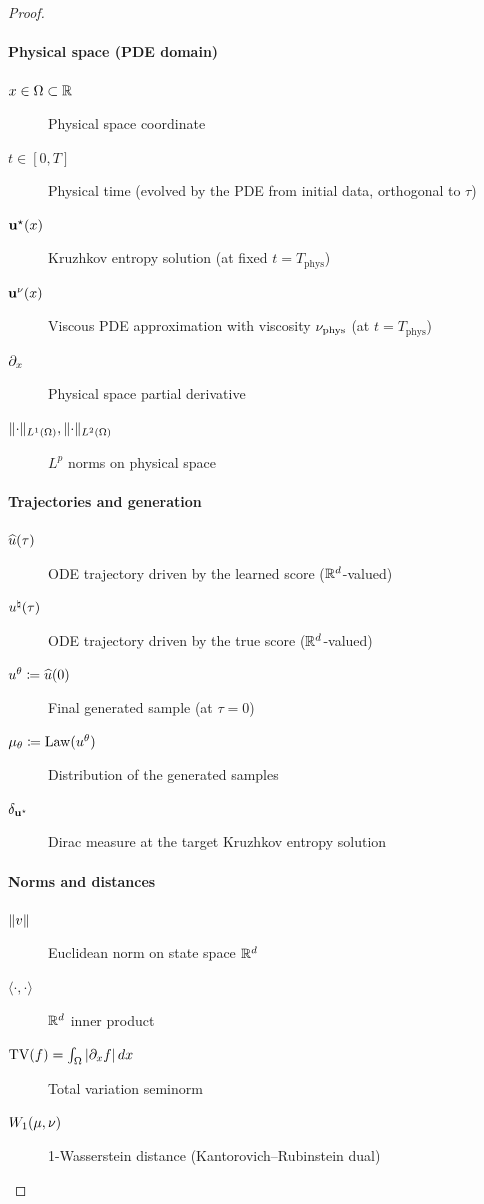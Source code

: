 \begin{proof}
\paragraph{Physical space (PDE domain)}
\begin{description}
  \item[$x \in \Omega \subset \mathbb{R}$] Physical space coordinate
  \item[{$t \in [0, T]$}] Physical time (evolved by the PDE from initial data, orthogonal to $\tau$)
  \item[$\mathbf{u}^{\star}(x)$] Kruzhkov entropy solution (at fixed $t = T_{\mathrm{phys}}$)
  \item[$\mathbf{u}^{\nu}(x)$] Viscous PDE approximation with viscosity $\nu_{\mathrm{phys}}$ (at $t = T_{\mathrm{phys}}$)
  \item[$\partial_{x}$] Physical space partial derivative
  \item[$\lVert \cdot \rVert_{L^1(\Omega)}, \lVert \cdot \rVert_{L^2(\Omega)}$] $L^p$ norms on physical space
\end{description}

\paragraph{Trajectories and generation}
\begin{description}
  \item[$\widehat{u}(\tau)$] ODE trajectory driven by the learned score ($\mathbb{R}^d$-valued)
  \item[$u^{\natural}(\tau)$] ODE trajectory driven by the true score ($\mathbb{R}^d$-valued)
  \item[$u^{\theta} \coloneqq \widehat{u}(0)$] Final generated sample (at $\tau = 0$)
  \item[$\mu_{\theta} \coloneqq \mathrm{Law}(u^{\theta})$] Distribution of the generated samples
  \item[$\delta_{\mathbf{u}^{\star}}$] Dirac measure at the target Kruzhkov entropy solution
\end{description}

\paragraph{Norms and distances}
\begin{description}
  \item[$\lVert v \rVert$] Euclidean norm on state space $\mathbb{R}^d$
  \item[$\langle \cdot, \cdot \rangle$] $\mathbb{R}^d$ inner product
  \item[$\mathrm{TV}(f) = \int_\Omega |\partial_{x} f| \, dx$] Total variation seminorm
  \item[$W_{1}(\mu, \nu)$] 1-Wasserstein distance (Kantorovich--Rubinstein dual)
\end{description}


\end{proof}
